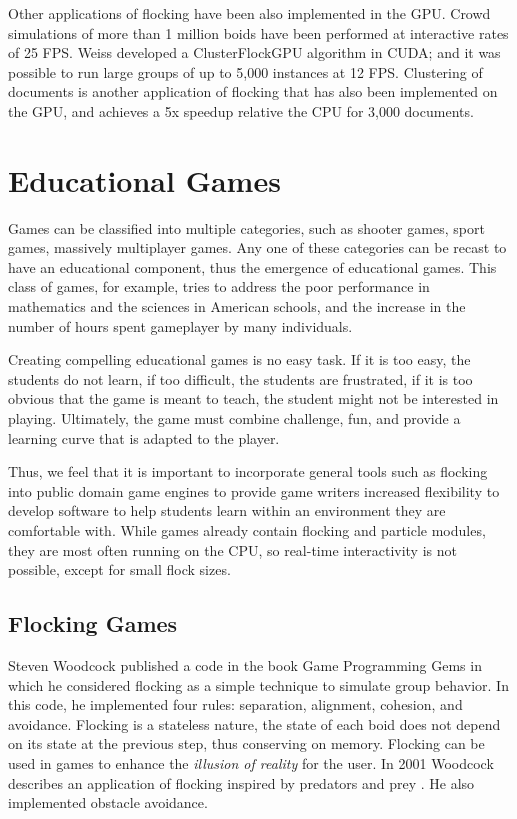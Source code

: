 Other applications of flocking have been also implemented in the GPU.  Crowd simulations of more than 1 million boids have been performed at interactive rates of 25 FPS\cite{supermassiveCrowd}. Weiss developed a ClusterFlockGPU algorithm in CUDA; and it was possible to run large groups of up to 5,000 instances at 12 FPS\cite{SI_GPU}. Clustering of documents is another application of flocking that has also been implemented on the GPU, and achieves a 5x speedup relative the CPU for 3,000 documents\cite{document2}. 

\section{Educational Games}
Games can be classified into multiple categories, such as shooter games, sport games, massively multiplayer games. Any one of these categories can be recast to have an educational component, thus the emergence of educational games. This class of games, for example, tries to address the poor performance in mathematics and the sciences in American schools, and the increase in the number of hours spent gameplayer by many individuals. 

 Creating compelling educational games is no easy task. If it is too easy, the students do not learn, if too difficult, the students are frustrated, if it is too obvious that the game is meant to teach, the student might not be interested in playing. Ultimately, the game must combine challenge, fun, and provide a learning curve that is adapted to the player.

Thus, we feel that it is important to incorporate general tools such as flocking into public domain game engines to provide game writers increased flexibility to develop software to help students learn within an environment they are comfortable with. While games already contain flocking and particle modules, they are most often running on the CPU, so real-time interactivity is not possible, except for small flock sizes. 

\subsection{Flocking Games}
Steven Woodcock published a code in the book Game Programming Gems in which he considered flocking as a simple technique to simulate group behavior\cite{gems1}. In this code, he implemented four rules: separation, alignment, cohesion, and avoidance.  Flocking is a stateless nature, the state of each boid does not depend on its state at the previous step, thus conserving on memory. Flocking can be used in games to enhance the \textit{illusion of reality} for the user.  In 2001 Woodcock describes an application of flocking inspired by predators and prey \cite{gems2}. 
He also implemented obstacle avoidance.

